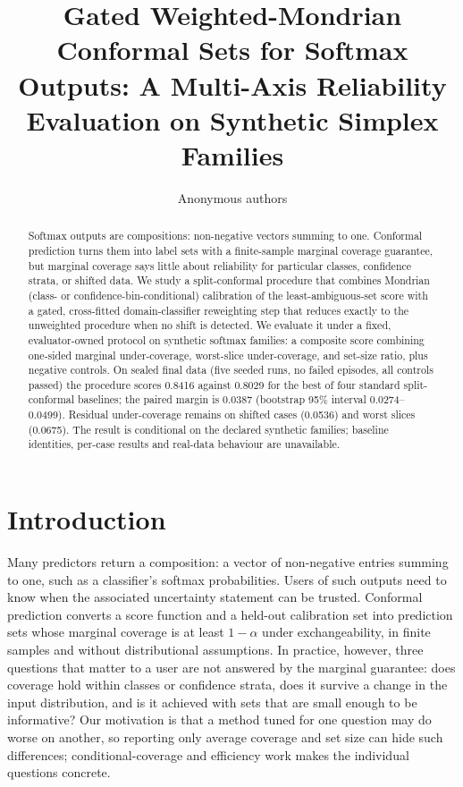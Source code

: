 \documentclass{article}
\title{Gated Weighted-Mondrian Conformal Sets for Softmax Outputs: A Multi-Axis Reliability Evaluation on Synthetic Simplex Families}
\author{Anonymous authors}
\begin{document}
\maketitle

\begin{abstract}
Softmax outputs are compositions: non-negative vectors summing to one. Conformal prediction turns them into label sets with a finite-sample marginal coverage guarantee, but marginal coverage says little about reliability for particular classes, confidence strata, or shifted data. We study a split-conformal procedure that combines Mondrian (class- or confidence-bin-conditional) calibration of the least-ambiguous-set score with a gated, cross-fitted domain-classifier reweighting step that reduces exactly to the unweighted procedure when no shift is detected. We evaluate it under a fixed, evaluator-owned protocol on synthetic softmax families: a composite score combining one-sided marginal under-coverage, worst-slice under-coverage, and set-size ratio, plus negative controls. On sealed final data (five seeded runs, no failed episodes, all controls passed) the procedure scores 0.8416 against 0.8029 for the best of four standard split-conformal baselines; the paired margin is 0.0387 (bootstrap 95\% interval 0.0274--0.0499). Residual under-coverage remains on shifted cases (0.0536) and worst slices (0.0675). The result is conditional on the declared synthetic families; baseline identities, per-case results and real-data behaviour are unavailable.
\end{abstract}

\section{Introduction}
Many predictors return a composition: a vector of non-negative entries summing to one, such as a classifier's softmax probabilities. Users of such outputs need to know when the associated uncertainty statement can be trusted. Conformal prediction converts a score function and a held-out calibration set into prediction sets whose marginal coverage is at least $1-\alpha$ under exchangeability, in finite samples and without distributional assumptions. In practice, however, three questions that matter to a user are not answered by the marginal guarantee: does coverage hold within classes or confidence strata, does it survive a change in the input distribution, and is it achieved with sets that are small enough to be informative? Our motivation is that a method tuned for one question may do worse on another, so reporting only average coverage and set size can hide such differences; conditional-coverage and efficiency work \citep{Gibbs2023ConformalPW,Ding2023ClassConditionalCP,Kiyani2024LengthOI} makes the individual questions concrete.
\end{document}
